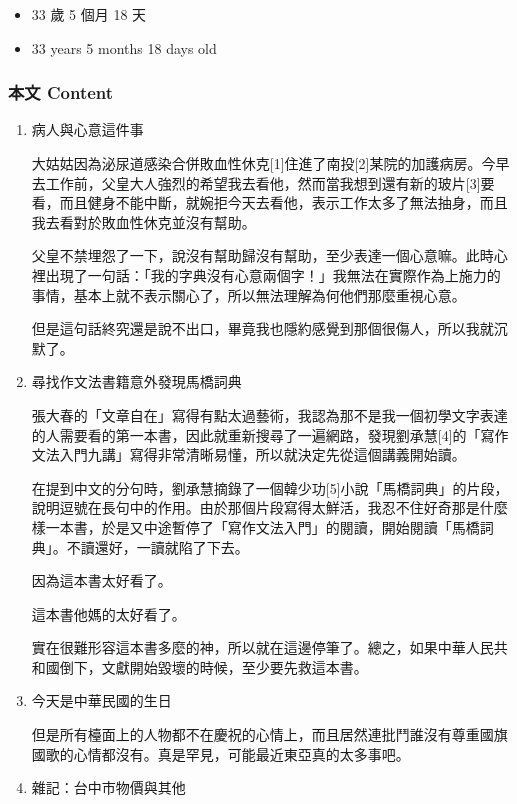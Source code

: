 \documentclass[a5paper, 12pt
]{book}
\providecommand{\tightlist}{%
  \setlength{\itemsep}{0pt}\setlength{\parskip}{0pt}}
\begin{document}
\begin{itemize}
\tightlist
\item
  33 歲 5 個月 18 天
\item
  33 years 5 months 18 days old
\end{itemize}

\hypertarget{ux672cux6587-content-11}{%
\subsubsection{本文 Content}\label{ux672cux6587-content-11}}

\begin{enumerate}
\def\labelenumi{\arabic{enumi}.}
\item
  病人與心意這件事

  大姑姑因為泌尿道感染合併敗血性休克{[}1{]}住進了南投{[}2{]}某院的加護病房。今早去工作前，父皇大人強烈的希望我去看他，然而當我想到還有新的玻片{[}3{]}要看，而且健身不能中斷，就婉拒今天去看他，表示工作太多了無法抽身，而且我去看對於敗血性休克並沒有幫助。

  父皇不禁埋怨了一下，說沒有幫助歸沒有幫助，至少表達一個心意嘛。此時心裡出現了一句話：「我的字典沒有心意兩個字！」我無法在實際作為上施力的事情，基本上就不表示關心了，所以無法理解為何他們那麼重視心意。

  但是這句話終究還是說不出口，畢竟我也隱約感覺到那個很傷人，所以我就沉默了。
\item
  尋找作文法書籍意外發現馬橋詞典

  張大春的「文章自在」寫得有點太過藝術，我認為那不是我一個初學文字表達的人需要看的第一本書，因此就重新搜尋了一遍網路，發現劉承慧{[}4{]}的「寫作文法入門九講」寫得非常清晰易懂，所以就決定先從這個講義開始讀。

  在提到中文的分句時，劉承慧摘錄了一個韓少功{[}5{]}小說「馬橋詞典」的片段，說明逗號在長句中的作用。由於那個片段寫得太鮮活，我忍不住好奇那是什麼樣一本書，於是又中途暫停了「寫作文法入門」的閱讀，開始閱讀「馬橋詞典」。不讀還好，一讀就陷了下去。

  因為這本書太好看了。

  這本書他媽的太好看了。

  實在很難形容這本書多麼的神，所以就在這邊停筆了。總之，如果中華人民共和國倒下，文獻開始毀壞的時候，至少要先救這本書。
\item
  今天是中華民國的生日

  但是所有檯面上的人物都不在慶祝的心情上，而且居然連批鬥誰沒有尊重國旗國歌的心情都沒有。真是罕見，可能最近東亞真的太多事吧。
\item
  雜記：台中市物價與其他


\end{enumerate}
\end{document}
